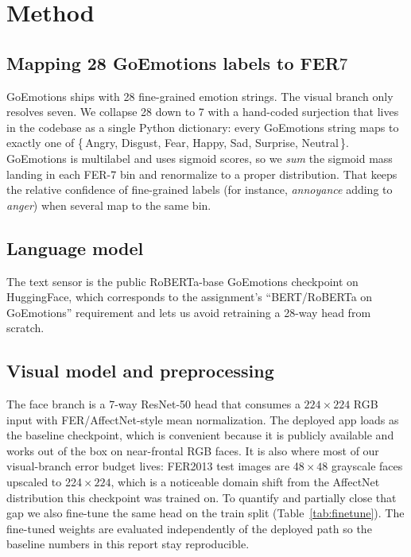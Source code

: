 \documentclass[sigconf,nonacm]{acmart}
\begin{document}
\section{Method}
\subsection{Mapping 28 GoEmotions labels to FER\texorpdfstring{$7$}{\,7}}
GoEmotions ships with 28 fine-grained emotion strings. The visual branch only resolves seven. We collapse 28 down to 7 with a hand-coded surjection that lives in the codebase as a single Python dictionary: every GoEmotions string maps to exactly one of \{\,Angry, Disgust, Fear, Happy, Sad, Surprise, Neutral\,\}. GoEmotions is multilabel and uses sigmoid scores, so we \emph{sum} the sigmoid mass landing in each FER-7 bin and renormalize to a proper distribution. That keeps the relative confidence of fine-grained labels (for instance, \emph{annoyance} adding to \emph{anger}) when several map to the same bin.

\subsection{Language model}
The text sensor is the public RoBERTa-base GoEmotions checkpoint  on HuggingFace, which corresponds to the assignment's ``BERT/RoBERTa on GoEmotions'' requirement and lets us avoid retraining a 28-way head from scratch.

\subsection{Visual model and preprocessing}
The face branch is a 7-way ResNet-50 head that consumes a $224\!\times\!224$ RGB input with FER/AffectNet-style mean normalization. The deployed app loads  as the baseline checkpoint, which is convenient because it is publicly available and works out of the box on near-frontal RGB faces. It is also where most of our visual-branch error budget lives: FER2013 test images are 48$\!\times\!48$ grayscale faces upscaled to 224$\!\times\!224$, which is a noticeable domain shift from the AffectNet distribution this checkpoint was trained on. To quantify and partially close that gap we also fine-tune the same head on the  train split (Table~\ref{tab:finetune}). The fine-tuned weights are evaluated independently of the deployed path so the baseline numbers in this report stay reproducible.
\end{document}
